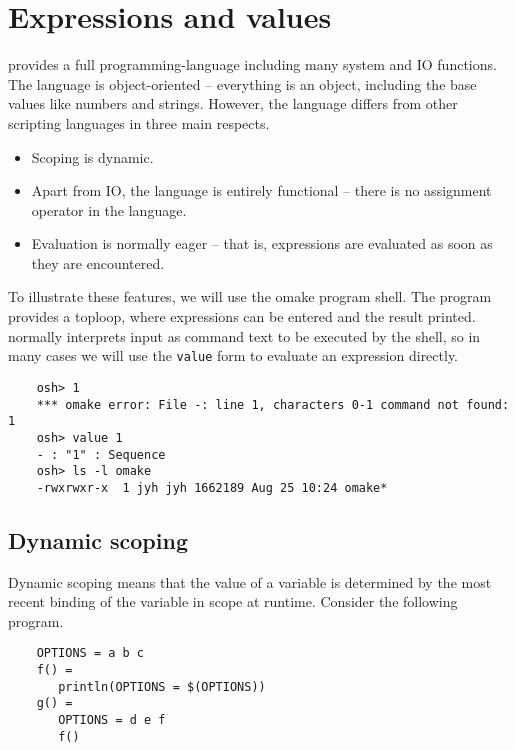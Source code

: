 %
%
\chapter{Expressions and values}
\label{chapter:extra}

 provides a full programming-language including many
system and IO functions.  The language is object-oriented -- everything is
an object, including the base values like numbers and strings.  However,
the  language differs from other scripting languages in
three main respects.

\begin{itemize}
\item Scoping is dynamic.
\item Apart from IO, the language is entirely functional -- there is no
  assignment operator in the language.
\item Evaluation is normally eager -- that is, expressions are evaluated as soon
  as they are encountered.
\end{itemize}

To illustrate these features, we will use the  omake program shell.
The  program provides a toploop, where expressions can be entered
and the result printed.   normally interprets input as command text
to be executed by the shell, so in many cases we will use the \verb+value+
form to evaluate an expression directly.

\begin{verbatim}
    osh> 1
    *** omake error: File -: line 1, characters 0-1 command not found: 1
    osh> value 1
    - : "1" : Sequence
    osh> ls -l omake
    -rwxrwxr-x  1 jyh jyh 1662189 Aug 25 10:24 omake*
\end{verbatim}

\section{Dynamic scoping}

Dynamic scoping means that the value of a variable is determined by the most
recent binding of the variable in scope at runtime.  Consider the following
program.

\begin{verbatim}
    OPTIONS = a b c
    f() =
       println(OPTIONS = $(OPTIONS))
    g() =
       OPTIONS = d e f
       f()
\end{verbatim}

